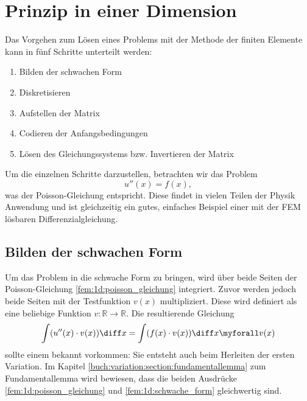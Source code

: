 %
%
%
%
\section{Prinzip in einer Dimension\label{fem:1d}}

Das Vorgehen zum Lösen eines Problems mit der Methode der finiten Elemente kann in fünf Schritte unterteilt werden:
\begin{enumerate}
    \item Bilden der schwachen Form
    \item Diskretisieren
    \item Aufstellen der Matrix
    \item Codieren der Anfangsbedingungen
    \item Lösen des Gleichungssystems bzw. Invertieren der Matrix
\end{enumerate}

Um die einzelnen Schritte darzustellen, betrachten wir das Problem
\begin{equation}
    u''(x) = f(x)
    \label{fem:1d:poisson_gleichung},
\end{equation}
was der Poisson-Gleichung entspricht. 
Diese findet in vielen Teilen der Physik Anwendung und ist gleichzeitig ein gutes, einfaches Beispiel einer mit der FEM lösbaren Differenzialgleichung.


\subsection{Bilden der schwachen Form}
Um das Problem in die schwache Form zu bringen, wird über beide Seiten der Poisson-Gleichung \ref{fem:1d:poisson_gleichung} integriert.
Zuvor werden jedoch beide Seiten mit der Testfunktion $ v(x) $ multipliziert. %
Diese wird definiert als eine beliebige Funktion $ v \colon \mathbb{R} \rightarrow \mathbb{R} $.
Die resultierende Gleichung
\begin{equation}
    \int(u''(x) \cdot v(x)) \diff x = \int(f(x) \cdot v(x)) \diff x \myforall v(x)
    \label{fem:1d:schwache_form}
\end{equation}
sollte einem bekannt vorkommen: Sie entsteht auch beim Herleiten der ersten Variation.
Im Kapitel \ref{buch:variation:section:fundamentallemma} zum Fundamentallemma wird bewiesen, dass die beiden Ausdrücke \ref{fem:1d:poisson_gleichung} und \ref{fem:1d:schwache_form} gleichwertig sind.

